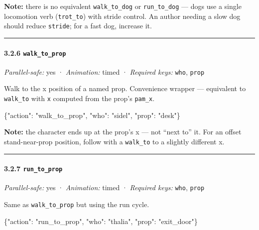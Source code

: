 \documentclass[
  12pt,
  letterpaper,
]{book}
\newenvironment{Shaded}{}{}
\newcommand{\DataTypeTok}[1]{\textcolor[rgb]{0.56,0.13,0.00}{#1}}
\newcommand{\FunctionTok}[1]{\textcolor[rgb]{0.02,0.16,0.49}{#1}}
\newcommand{\StringTok}[1]{\textcolor[rgb]{0.25,0.44,0.63}{#1}}
\begin{document}
\textbf{Note:} there is no equivalent \texttt{walk\_to\_dog} or
\texttt{run\_to\_dog} --- dogs use a single locomotion verb
(\texttt{trot\_to}) with stride control. An author needing a slow dog
should reduce \texttt{stride}; for a fast dog, increase it.

\begin{center}\rule{0.5\linewidth}{0.5pt}\end{center}

\paragraph{\texorpdfstring{3.2.6
\texttt{walk\_to\_prop}}{3.2.6 walk\_to\_prop}}\label{walk_to_prop}

\emph{Parallel-safe:} yes · \emph{Animation:} timed · \emph{Required
keys:} \texttt{who}, \texttt{prop}

Walk to the x position of a named prop. Convenience wrapper ---
equivalent to \texttt{walk\_to} with \texttt{x} computed from the prop's
\texttt{pam\_x}.

\begin{Shaded}
\begin{Highlighting}[]
\FunctionTok{\{}\DataTypeTok{"action"}\FunctionTok{:} \StringTok{"walk\_to\_prop"}\FunctionTok{,} \DataTypeTok{"who"}\FunctionTok{:} \StringTok{"sidel"}\FunctionTok{,} \DataTypeTok{"prop"}\FunctionTok{:} \StringTok{"desk"}\FunctionTok{\}}
\end{Highlighting}
\end{Shaded}

\textbf{Note:} the character ends up at the prop's x --- not ``next to''
it. For an offset stand-near-prop position, follow with a
\texttt{walk\_to} to a slightly different x.

\begin{center}\rule{0.5\linewidth}{0.5pt}\end{center}

\paragraph{\texorpdfstring{3.2.7
\texttt{run\_to\_prop}}{3.2.7 run\_to\_prop}}\label{run_to_prop}

\emph{Parallel-safe:} yes · \emph{Animation:} timed · \emph{Required
keys:} \texttt{who}, \texttt{prop}

Same as \texttt{walk\_to\_prop} but using the run cycle.

\begin{Shaded}
\begin{Highlighting}[]
\FunctionTok{\{}\DataTypeTok{"action"}\FunctionTok{:} \StringTok{"run\_to\_prop"}\FunctionTok{,} \DataTypeTok{"who"}\FunctionTok{:} \StringTok{"thalia"}\FunctionTok{,} \DataTypeTok{"prop"}\FunctionTok{:} \StringTok{"exit\_door"}\FunctionTok{\}}
\end{Highlighting}
\end{Shaded}
\end{document}
